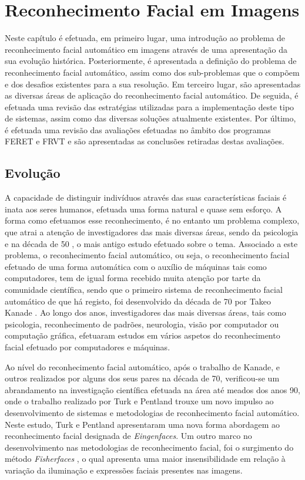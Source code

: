\chapter{Reconhecimento Facial em Imagens} \label{chap:reco}

Neste capítulo é efetuada, em primeiro lugar, uma introdução ao problema de reconhecimento facial automático em imagens através de uma apresentação da sua evolução histórica. Posteriormente, é apresentada a definição do problema de reconhecimento facial automático, assim como dos sub-problemas que o compõem e dos desafios existentes para a sua resolução. Em terceiro lugar, são apresentadas as diversas áreas de aplicação do reconhecimento facial automático. De seguida, é efetuada uma revisão das estratégias utilizadas para a implementação deste tipo de sistemas, assim como das diversas soluções atualmente existentes. Por último, é efetuada uma revisão das avaliações efetuadas no âmbito dos programas FERET e FRVT e são apresentadas as conclusões retiradas destas avaliações.

\section{Evolução}
A capacidade de distinguir indivíduos através das suas características faciais é inata aos seres humanos, efetuada uma forma natural e quase sem esforço. A forma como efetuamos esse reconhecimento, é no entanto um problema complexo, que atrai a atenção de investigadores das mais diversas áreas, sendo da psicologia e na década de 50 \cite{BRUNERJEROMES.TAGIURI1954}, o mais antigo estudo efetuado sobre o tema. Associado a este problema, o reconhecimento facial automático, ou seja, o reconhecimento facial efetuado de uma forma automática com o auxílio de máquinas tais como computadores, tem de igual forma recebido muita atenção por tarte da comunidade científica, sendo que o primeiro sistema de reconhecimento facial automático de que há registo, foi desenvolvido da década de 70 por Takeo Kanade \cite{Kanade1973}. Ao longo dos anos, investigadores das mais diversas áreas, tais como  psicologia, reconhecimento de padrões, neurologia, visão por computador ou computação gráfica, efetuaram estudos em vários aspetos do reconhecimento facial efetuado por computadores e máquinas.

Ao nível do reconhecimento facial automático, após o trabalho de Kanade, e outros realizados por alguns dos seus pares na década de 70, verificou-se um abrandamento na investigação científica efetuada na área até meados dos anos 90, onde o trabalho realizado por Turk e Pentland \cite{Turk1991} trouxe um novo impulso ao desenvolvimento de sistemas e metodologias de reconhecimento facial automático. Neste estudo, Turk e Pentland apresentaram uma nova forma abordagem ao reconhecimento facial designada de \textit{Eingenfaces}. Um outro marco no desenvolvimento nas metodologias de reconhecimento facial, foi o surgimento do método \textit{Fisherfaces} \cite{Belhumeur1997, Zhao1998}, o qual apresenta uma maior insensibilidade em relação à variação da iluminação e expressões faciais presentes nas imagens.

